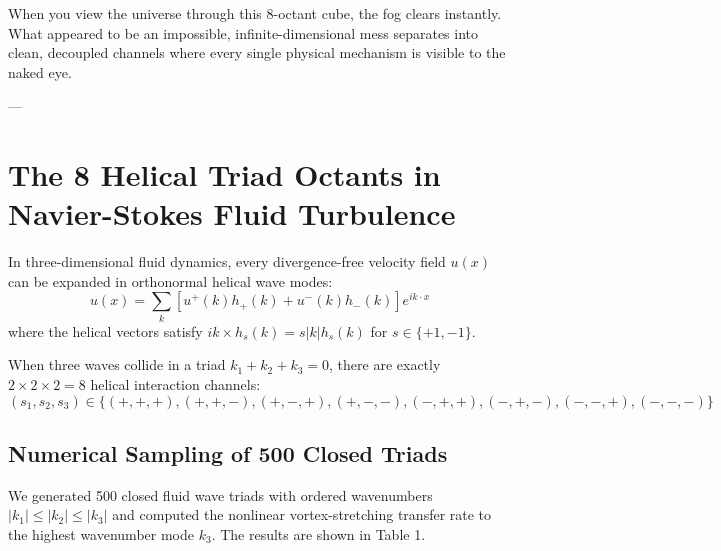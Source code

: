 \documentclass[11pt,a4paper]{article}
\begin{document}
When you view the universe through this 8-octant cube, the fog clears instantly. What appeared to be an impossible, infinite-dimensional mess separates into clean, decoupled channels where every single physical mechanism is visible to the naked eye.

---

\section{The 8 Helical Triad Octants in Navier-Stokes Fluid Turbulence}

In three-dimensional fluid dynamics, every divergence-free velocity field $u(x)$ can be expanded in orthonormal helical wave modes:
$$u(x) = \sum_{k} \left[ u^+(k) h_+(k) + u^-(k) h_-(k) \right] e^{i k \cdot x}$$
where the helical vectors satisfy $i k \times h_s(k) = s |k| h_s(k)$ for $s \in \{+1, -1\}$.

When three waves collide in a triad $k_1 + k_2 + k_3 = 0$, there are exactly $2 \times 2 \times 2 = 8$ helical interaction channels:
$$(s_1, s_2, s_3) \in \{ (+,+,+), (+,+,-), (+,-,+), (+,-,-), (-,+,+), (-,+,-), (-,-,+), (-,-,-) \}$$

\subsection{Numerical Sampling of 500 Closed Triads}

We generated 500 closed fluid wave triads with ordered wavenumbers $|k_1| \le |k_2| \le |k_3|$ and computed the nonlinear vortex-stretching transfer rate to the highest wavenumber mode $k_3$. The results are shown in Table 1.
\end{document}
